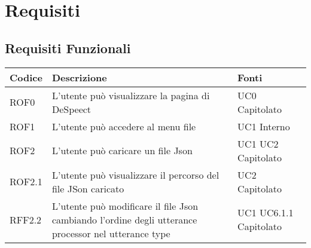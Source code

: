 \documentclass[../AnalisideiRequisiti.tex]{subfiles}
\begin{document}
	\chapter{Requisiti}
	\section{Requisiti Funzionali}
	\begin{longtable}{| p{3cm} | p{6cm} | p{3cm} |}
		\hline
		\textbf{Codice} & \textbf{Descrizione} & \textbf{Fonti}\\
		\hline
		\endhead
		\newline ROF0&
		\newline L'utente può visualizzare la pagina di DeSpeect&
		\newline UC0 \newline Capitolato
		\\[1em]
		\hline
		\newline ROF1&
		\newline L'utente può accedere al menu file&
		\newline UC1 \newline Interno
		\\[1em]	
		
		\hline
			
		\newline ROF2&
		\newline L'utente può caricare un file Json&
		\newline UC1 \newline UC2 \newline Capitolato
		\\[1em]	
			\hline	
			
		\newline ROF2.1&
		\newline L'utente può visualizzare il percorso del file JSon caricato&
		\newline UC2 \newline Capitolato 
		\\[1em]	
		\hline	
		
		\newline RFF2.2&
		\newline L'utente può modificare il file Json cambiando l'ordine degli utterance processor nel utterance type&
		\newline UC1 \newline UC6.1.1 \newline Capitolato
		\\[1em]	
		\hline
				

\end{longtable}
\end{document}
